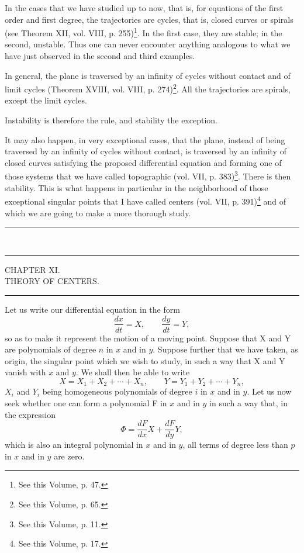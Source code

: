 \documentclass[11pt]{article}
\newcommand{\ornament}{\begin{center}\rule{2.5em}{0.4pt}\,\raisebox{0.1ex}{\tiny$\bullet\bullet\bullet$}\,\rule{2.5em}{0.4pt}\end{center}}
\newcommand{\shortline}{\begin{center}\rule{3.5em}{0.4pt}\end{center}}
\begin{document}
In the cases that we have studied up to now, that is, for equations of the first order and first degree, the trajectories are cycles, that is, closed curves or spirals (see Theorem XII, vol. VIII, p. 255)\footnote{See this Volume, p. 47.}. In the first case, they are stable; in the second, unstable. Thus one can never encounter anything analogous to what we have just observed in the second and third examples.

In general, the plane is traversed by an infinity of cycles without contact and of limit cycles (Theorem XVIII, vol. VIII, p. 274)\footnote{See this Volume, p. 65.}. All the trajectories are spirals, except the limit cycles.

Instability is therefore the rule, and stability the exception.

It may also happen, in very exceptional cases, that the plane, instead of being traversed by an infinity of cycles without contact, is traversed by an infinity of closed curves satisfying the proposed differential equation and forming one of those systems that we have called topographic (vol. VII, p. 383)\footnote{See this Volume, p. 11.}. There is then stability. This is what happens in particular in the neighborhood of those exceptional singular points that I have called centers (vol. VII, p. 391)\footnote{See this Volume, p. 17.} and of which we are going to make a more thorough study.

\ornament

\begin{center}
{\large CHAPTER XI.}\\[0.4em]
{\small THEORY OF CENTERS.}
\end{center}
\shortline

Let us write our differential equation in the form
\[
\frac{dx}{dt}=X,\qquad \frac{dy}{dt}=Y,
\]
so as to make it represent the motion of a moving point. Suppose that X and Y are polynomials of degree $n$ in $x$ and in $y$. Suppose further that we have taken, as origin, the singular point which we wish to study, in such a way that X and Y vanish with $x$ and $y$. We shall then be able to write
\[
X=X_1+X_2+\cdots+X_n,
\qquad
Y=Y_1+Y_2+\cdots+Y_n,
\]
$X_i$ and $Y_i$ being homogeneous polynomials of degree $i$ in $x$ and in $y$. Let us now seek whether one can form a polynomial F in $x$ and in $y$ in such a way that, in the expression
\[
\Phi=\frac{dF}{dx}X+\frac{dF}{dy}Y,
\]
which is also an integral polynomial in $x$ and in $y$, all terms of degree less than $p$ in $x$ and in $y$ are zero.
\end{document}

